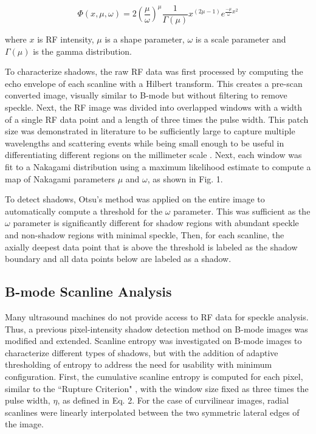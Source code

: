 \documentclass[preprint,5p,authoryear]{elsarticle}
\begin{document}
\begin{equation}
\Phi(x,\mu,\omega) = 2(\frac{\mu}{\omega})^{\mu}\frac{1}{\Gamma(\mu)}x^{(2\mu-1)}e^{\frac{-\mu}{\omega}x^{2}}
\end{equation}

where $x$ is RF intensity, $\mu$ is a shape parameter, $\omega$ is a scale parameter and $\Gamma(\mu)$ is the gamma distribution.

To characterize shadows, the raw RF data was first processed by computing the echo envelope of each scanline with a Hilbert transform. This creates a pre-scan converted image, visually similar to B-mode but without filtering to remove speckle. Next, the RF image was divided into overlapped windows with a width of a single RF data point and a length of three times the pulse width. This patch size was demonstrated in literature to be sufficiently large to capture multiple wavelengths and scattering events while being small enough to be useful in differentiating different regions on the millimeter scale \citep{Byra2016}. Next, each window was fit to a Nakagami distribution using a maximum likelihood estimate to compute a map of Nakagami parameters $\mu$ and $\omega$, as shown in Fig. 1.

To detect shadows, Otsu's method was applied on the entire image to automatically compute a threshold for the $\omega$ parameter. This was sufficient as the $\omega$ parameter is significantly different for shadow regions with abundant speckle and non-shadow regions with minimal speckle, Then, for each scanline, the axially deepest data point that is above the threshold is labeled as the shadow boundary and all data points below are labeled as a shadow.

\subsection*{B-mode Scanline Analysis}

Many ultrasound machines do not provide access to RF data for speckle analysis. Thus, a previous pixel-intensity shadow detection method on B-mode images was modified and extended. Scanline entropy was investigated on B-mode images to characterize different types of shadows, but with the addition of adaptive thresholding of entropy to address the need for usability with minimum configuration. First, the cumulative scanline entropy is computed for each pixel, similar to the ``Rupture Criterion" \citep{Hellier2010}, with the window size fixed as three times the pulse width, $\eta$, as defined in Eq. 2. For the case of curvilinear images, radial scanlines were linearly interpolated between the two symmetric lateral edges of the image.
\end{document}
